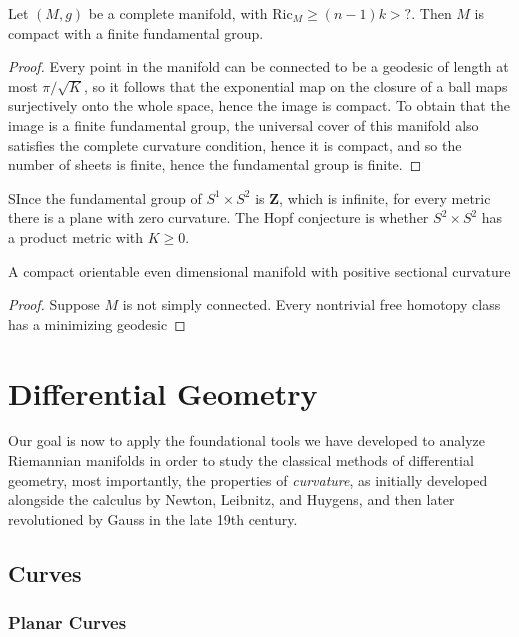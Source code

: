 \begin{corollary}
    Let $(M,g)$ be a complete manifold, with $\text{Ric}_M \geq (n-1)k > ?$. Then $M$ is compact with a finite fundamental group.
\end{corollary}
\begin{proof}
    Every point in the manifold can be connected to be a geodesic of length at most $\pi/\sqrt{K}$, so it follows that the exponential map on the closure of a ball maps surjectively onto the whole space, hence the image is compact. To obtain that the image is a finite fundamental group, the universal cover of this manifold also satisfies the complete curvature condition, hence it is compact, and so the number of sheets is finite, hence the fundamental group is finite.
\end{proof}

\begin{example}
    SInce the fundamental group of $S^1 \times S^2$ is $\mathbf{Z}$, which is infinite, for every metric there is a plane with zero curvature. The Hopf conjecture is whether $S^2 \times S^2$ has a product metric with $K \geq 0$.
\end{example}

\begin{theorem}[Synge]
    A compact orientable even dimensional manifold with positive sectional curvature
\end{theorem}
\begin{proof}
    Suppose $M$ is not simply connected. Every nontrivial free homotopy class has a minimizing geodesic
\end{proof}




\part{Differential Geometry}

Our goal is now to apply the foundational tools we have developed to analyze Riemannian manifolds in order to study the classical methods of differential geometry, most importantly, the properties of \emph{curvature}, as initially developed alongside the calculus by Newton, Leibnitz, and Huygens, and then later revolutioned by Gauss in the late 19th century.

\chapter{Curves}

\section{Planar Curves}

